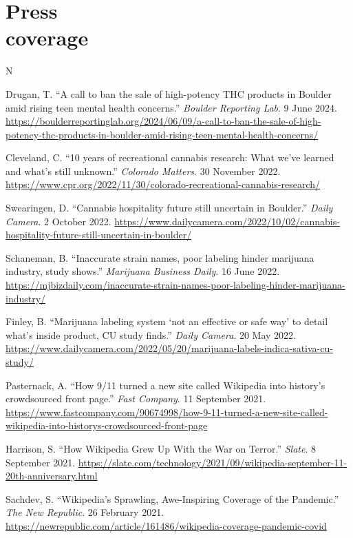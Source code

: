 \documentclass{cv}
\begin{document}
	\section{Press\\coverage}
	\begin{entries}{N}
		\item Drugan, T. ``A call to ban the sale of high-potency THC products in Boulder amid rising teen mental health concerns.'' \textit{Boulder Reporting Lab}. 9 June 2024. \url{https://boulderreportinglab.org/2024/06/09/a-call-to-ban-the-sale-of-high-potency-thc-products-in-boulder-amid-rising-teen-mental-health-concerns/}
		\item Cleveland, C. ``10 years of recreational cannabis research: What we've learned and what's still unknown.'' \textit{Colorado Matters}. 30 November 2022. \url{https://www.cpr.org/2022/11/30/colorado-recreational-cannabis-research/}
		\item Swearingen, D. ``Cannabis hospitality future still uncertain in Boulder.'' \textit{Daily Camera}. 2 October 2022. \url{https://www.dailycamera.com/2022/10/02/cannabis-hospitality-future-still-uncertain-in-boulder/}
		\item Schaneman, B. ``Inaccurate strain names, poor labeling hinder marijuana industry, study shows.'' \textit{Marijuana Business Daily}. 16 June 2022. \url{https://mjbizdaily.com/inaccurate-strain-names-poor-labeling-hinder-marijuana-industry/}
		\item Finley, B. ``Marijuana labeling system `not an effective or safe way' to detail what's inside product, CU study finds.'' \textit{Daily Camera}. 20 May 2022. \url{https://www.dailycamera.com/2022/05/20/marijuana-labels-indica-sativa-cu-study/}
		\item Pasternack, A. ``How 9/11  turned a new site called Wikipedia into history's crowdsourced front page.'' \textit{Fast Company}. 11 September 2021. \url{https://www.fastcompany.com/90674998/how-9-11-turned-a-new-site-called-wikipedia-into-historys-crowdsourced-front-page}
		\item Harrison, S. ``How Wikipedia Grew Up With the War on Terror.'' \textit{Slate}. 8 September 2021. \url{https://slate.com/technology/2021/09/wikipedia-september-11-20th-anniversary.html}
		\item Sachdev, S. ``Wikipedia's Sprawling, Awe-Inspiring Coverage of the Pandemic.'' \textit{The New Republic}. 26 February 2021. \url{https://newrepublic.com/article/161486/wikipedia-coverage-pandemic-covid}

\end{entries}
\end{document}
